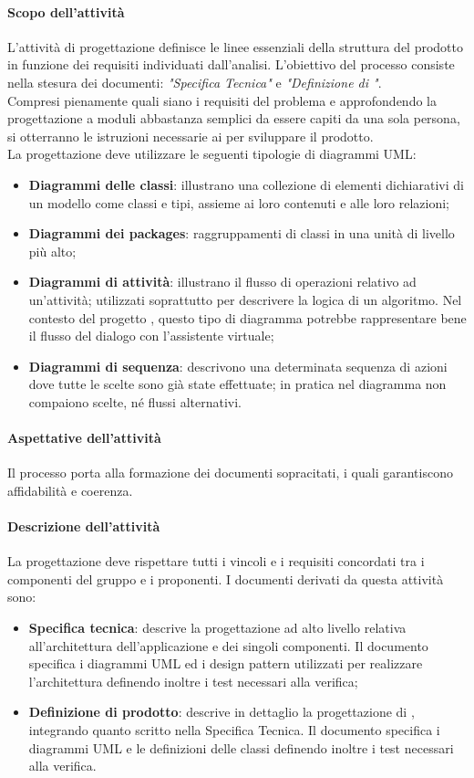  \paragraph{Scopo dell'attività}
 L'attività di progettazione definisce le linee essenziali della struttura del prodotto  in
 funzione dei requisiti individuati dall'analisi. L'obiettivo del processo consiste nella stesura dei
 documenti: \textit{"Specifica Tecnica"} e \textit{"Definizione di "}. \\
 Compresi pienamente quali siano i requisiti del problema e approfondendo la progettazione a moduli
 abbastanza semplici da essere capiti da una sola persona, si otterranno le
 istruzioni necessarie ai \PRP{} per sviluppare il prodotto.\\
 La progettazione deve utilizzare le seguenti tipologie di diagrammi UML:
 \begin{itemize}
 	\item \textbf{Diagrammi delle classi}: illustrano una collezione di elementi dichiarativi di un modello	come classi e tipi, assieme ai loro contenuti e alle loro relazioni;
 	\item \textbf{Diagrammi dei packages}: raggruppamenti di classi in una unità di livello più alto;
 	\item \textbf{Diagrammi di attività}: illustrano il flusso di operazioni relativo ad un’attività; utilizzati	soprattutto per descrivere la logica di un algoritmo. Nel contesto del progetto \PROGETTO, questo tipo di diagramma potrebbe rappresentare bene il flusso del dialogo con l'assistente virtuale;
 	\item \textbf{Diagrammi di sequenza}: descrivono una determinata sequenza di azioni dove tutte le
 	scelte sono già state effettuate; in pratica nel diagramma non compaiono scelte, né flussi
 	alternativi.
 \end{itemize}
 \paragraph{Aspettative dell'attività}
 Il processo porta alla formazione dei documenti sopracitati, i quali garantiscono affidabilità e
 coerenza.
 \paragraph{Descrizione dell'attività}
 La progettazione deve rispettare tutti i vincoli e i requisiti concordati tra i componenti del gruppo
 e i proponenti. I documenti derivati da questa attività sono:
 \begin{itemize}
 	\item \textbf{Specifica tecnica}: descrive la progettazione ad alto livello relativa all'architettura dell'applicazione
 	e dei singoli componenti. Il documento specifica i diagrammi UML ed i design
 	pattern utilizzati per realizzare l'architettura definendo inoltre i test necessari alla verifica;
 	\item \textbf{Definizione di prodotto}: descrive in dettaglio la progettazione di , integrando
 	quanto scritto nella Specifica Tecnica. Il documento specifica i diagrammi UML e le
 	definizioni delle classi definendo inoltre i test necessari alla verifica.
 \end{itemize}
